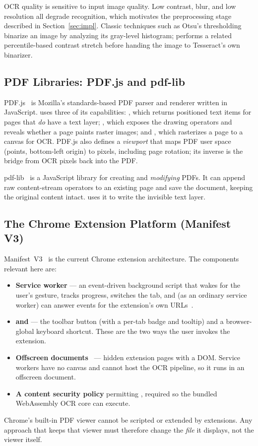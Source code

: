 OCR quality is sensitive to input image quality. Low contrast, blur, and low
resolution all degrade recognition, which motivates the preprocessing stage
described in Section~\ref{sec:impl}. Classic techniques such as Otsu's
thresholding~\cite{otsu1979} binarize an image by analyzing its gray-level
histogram; \proj{} performs a related percentile-based contrast stretch before
handing the image to Tesseract's own binarizer.

\subsection{PDF Libraries: PDF.js and pdf-lib}
PDF.js~\cite{pdfjs} is Mozilla's standards-based PDF parser and renderer written
in JavaScript. \proj{} uses three of its capabilities: ,
which returns positioned text items for pages that \emph{do} have a text layer;
, which exposes the drawing operators and reveals whether
a page paints raster images; and , which rasterizes a page to a
canvas for OCR. PDF.js also defines a \emph{viewport} that maps PDF user space
(points, bottom-left origin) to pixels, including page rotation; its inverse is
the bridge from OCR pixels back into the PDF.

pdf-lib~\cite{pdflib} is a JavaScript library for creating and \emph{modifying}
PDFs. It can append raw content-stream operators to an existing page and save
the document, keeping the original content intact. \proj{} uses it to write the
invisible text layer.

\subsection{The Chrome Extension Platform (Manifest V3)}
Manifest~V3~\cite{mv3} is the current Chrome extension architecture. The
components relevant here are:
\begin{itemize}
  \item \textbf{Service worker} --- an event-driven background script that wakes
        for the user's gesture, tracks progress, switches the tab, and (as an
        ordinary service worker) can answer  events for the
        extension's own URLs~\cite{swfetch}.
  \item \textbf{ and } --- the toolbar
        button (with a per-tab badge and tooltip) and a browser-global keyboard
        shortcut. These are the two ways the user invokes the extension.
  \item \textbf{Offscreen documents}~\cite{offscreen} --- hidden extension pages
        with a DOM. Service workers have no canvas and cannot host the OCR
        pipeline, so it runs in an offscreen document.
  \item \textbf{A content security policy} permitting
        , required so the bundled
        WebAssembly OCR core can execute.
\end{itemize}
Chrome's built-in PDF viewer cannot be scripted or extended by extensions. Any
approach that keeps that viewer must therefore change the \emph{file} it
displays, not the viewer itself.

